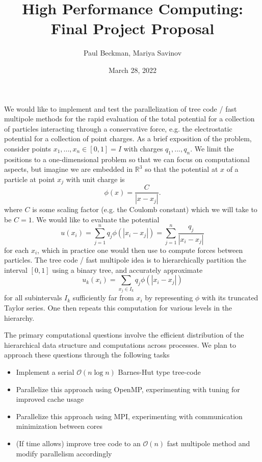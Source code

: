 \documentclass{article}
\title{High Performance Computing: Final Project Proposal}
\author{Paul Beckman, Mariya Savinov}
\date{March 28, 2022}
\newcommand{\abs}[1]{\left|#1\right|}
\renewcommand{\O}{\mathcal{O}}
\newcommand{\R}{\mathbb{R}}
\begin{document}
\maketitle

We would like to implement and test the parallelization of tree code \cite{barnes1986hierarchical} / fast multipole methods \cite{greengard1987fast} for the rapid evaluation of the total potential for a collection of particles interacting through a conservative force, e.g. the electrostatic potential for a collection of point charges. As a brief exposition of the problem, consider points $x_1, ..., x_n \in [0,1] = I$ with charges $q_1, ..., q_n$. We limit the positions to a one-dimensional problem so that we can focus on computational aspects, but imagine we are embedded in $\R^3$ so that the potential at $x$ of a particle at point $x_j$ with unit charge is
\begin{equation}
  \phi(x) = \frac{C}{\abs{x-x_j}}.
\end{equation}
where $C$ is some scaling factor (e.g. the Coulomb constant) which we will take to be $C=1$. We would like to evaluate the potential
\begin{equation}
  u(x_i) = \sum_{j=1}^n q_j \phi(\abs{x_i - x_j}) = \sum_{j=1}^n \dfrac{q_j}{\abs{x_i-x_j}}
\end{equation}
for each $x_i$, which in practice one would then use to compute forces between particles. The tree code / fast multipole idea is to hierarchically partition the interval $[0,1]$ using a binary tree, and accurately approximate
\begin{equation}
  u_k(x_i) = \sum_{x_j \in I_k} q_j \phi(\abs{x_i - x_j})
\end{equation} for all subintervals $I_k$ sufficiently far from $x_i$ by representing $\phi$ with its truncated Taylor series. One then repeats this computation for various levels in the hierarchy.

The primary computational questions involve the efficient distribution of the hierarchical data structure and computations across processes. We plan to approach these questions through the following tasks
\begin{itemize}
  \item Implement a serial $\O(n\log n)$ Barnes-Hut type tree-code
  \item Parallelize this approach using OpenMP, experimenting with tuning for improved cache usage
  \item Parallelize this approach using MPI, experimenting with communication minimization between cores
  \item (If time allows) improve tree code to an $\O(n)$ fast multipole method and modify parallelism accordingly
\end{itemize}
\end{document}
